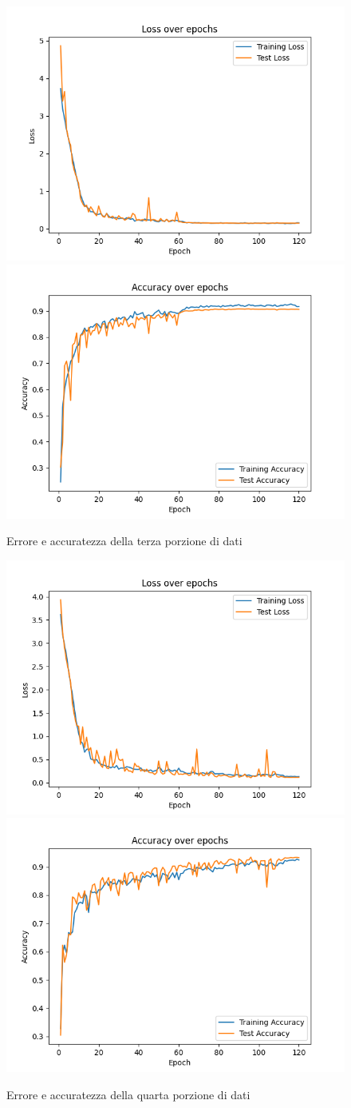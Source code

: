 \begin{figure}
	\centering
	\includegraphics[width=0.4\columnwidth]{Immagini/fold_2_loss.png} \includegraphics[width=0.4\columnwidth]{Immagini/fold_2_accuracy.png}
	\caption{Errore e accuratezza della terza porzione di dati}
	\label{fig:loss e accuratezza della terza porzione di dati}
\end{figure}

\begin{figure}
	\centering
	\includegraphics[width=0.4\columnwidth]{Immagini/fold_3_loss.png} \includegraphics[width=0.4\columnwidth]{Immagini/fold_3_accuracy.png}
	\caption{Errore e accuratezza della quarta porzione di dati}
	\label{fig:loss e accuratezza della quarta porzione di dati}
\end{figure}


